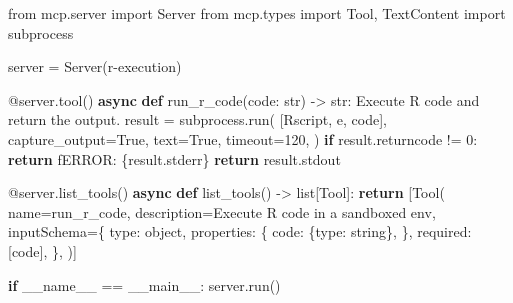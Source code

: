 \documentclass[
  letterpaper,
  11pt]{scrbook}
\newenvironment{Shaded}{\begin{snugshade}}{\end{snugshade}}
\newcommand{\AttributeTok}[1]{\textcolor[rgb]{0.40,0.45,0.13}{#1}}
\newcommand{\BuiltInTok}[1]{\textcolor[rgb]{0.00,0.23,0.31}{#1}}
\newcommand{\CommentTok}[1]{\textcolor[rgb]{0.37,0.37,0.37}{#1}}
\newcommand{\ControlFlowTok}[1]{\textcolor[rgb]{0.00,0.23,0.31}{\textbf{#1}}}
\newcommand{\DecValTok}[1]{\textcolor[rgb]{0.68,0.00,0.00}{#1}}
\newcommand{\ImportTok}[1]{\textcolor[rgb]{0.00,0.46,0.62}{#1}}
\newcommand{\KeywordTok}[1]{\textcolor[rgb]{0.00,0.23,0.31}{\textbf{#1}}}
\newcommand{\NormalTok}[1]{\textcolor[rgb]{0.00,0.23,0.31}{#1}}
\newcommand{\OperatorTok}[1]{\textcolor[rgb]{0.37,0.37,0.37}{#1}}
\newcommand{\SpecialCharTok}[1]{\textcolor[rgb]{0.37,0.37,0.37}{#1}}
\newcommand{\SpecialStringTok}[1]{\textcolor[rgb]{0.13,0.47,0.30}{#1}}
\newcommand{\StringTok}[1]{\textcolor[rgb]{0.13,0.47,0.30}{#1}}
\newcommand{\VariableTok}[1]{\textcolor[rgb]{0.07,0.07,0.07}{#1}}
\begin{document}
\begin{Shaded}
\begin{Highlighting}[]
\ImportTok{from}\NormalTok{ mcp.server }\ImportTok{import}\NormalTok{ Server}
\ImportTok{from}\NormalTok{ mcp.types }\ImportTok{import}\NormalTok{ Tool, TextContent}
\ImportTok{import}\NormalTok{ subprocess}

\NormalTok{server }\OperatorTok{=}\NormalTok{ Server(}\StringTok{\textquotesingle{}r{-}execution\textquotesingle{}}\NormalTok{)}

\AttributeTok{@server.tool}\NormalTok{()}
\ControlFlowTok{async} \KeywordTok{def}\NormalTok{ run\_r\_code(code: }\BuiltInTok{str}\NormalTok{) }\OperatorTok{{-}\textgreater{}} \BuiltInTok{str}\NormalTok{:}
    \CommentTok{\textquotesingle{}\textquotesingle{}\textquotesingle{}Execute R code and return the output.\textquotesingle{}\textquotesingle{}\textquotesingle{}}
\NormalTok{    result }\OperatorTok{=}\NormalTok{ subprocess.run(}
\NormalTok{        [}\StringTok{\textquotesingle{}Rscript\textquotesingle{}}\NormalTok{, }\StringTok{\textquotesingle{}{-}e\textquotesingle{}}\NormalTok{, code],}
\NormalTok{        capture\_output}\OperatorTok{=}\VariableTok{True}\NormalTok{,}
\NormalTok{        text}\OperatorTok{=}\VariableTok{True}\NormalTok{,}
\NormalTok{        timeout}\OperatorTok{=}\DecValTok{120}\NormalTok{,}
\NormalTok{    )}
    \ControlFlowTok{if}\NormalTok{ result.returncode }\OperatorTok{!=} \DecValTok{0}\NormalTok{:}
        \ControlFlowTok{return} \SpecialStringTok{f\textquotesingle{}ERROR: }\SpecialCharTok{\{}\NormalTok{result}\SpecialCharTok{.}\NormalTok{stderr}\SpecialCharTok{\}}\SpecialStringTok{\textquotesingle{}}
    \ControlFlowTok{return}\NormalTok{ result.stdout}

\AttributeTok{@server.list\_tools}\NormalTok{()}
\ControlFlowTok{async} \KeywordTok{def}\NormalTok{ list\_tools() }\OperatorTok{{-}\textgreater{}} \BuiltInTok{list}\NormalTok{[Tool]:}
    \ControlFlowTok{return}\NormalTok{ [Tool(}
\NormalTok{        name}\OperatorTok{=}\StringTok{\textquotesingle{}run\_r\_code\textquotesingle{}}\NormalTok{,}
\NormalTok{        description}\OperatorTok{=}\StringTok{\textquotesingle{}Execute R code in a sandboxed env\textquotesingle{}}\NormalTok{,}
\NormalTok{        inputSchema}\OperatorTok{=}\NormalTok{\{}
            \StringTok{\textquotesingle{}type\textquotesingle{}}\NormalTok{: }\StringTok{\textquotesingle{}object\textquotesingle{}}\NormalTok{,}
            \StringTok{\textquotesingle{}properties\textquotesingle{}}\NormalTok{: \{}
                \StringTok{\textquotesingle{}code\textquotesingle{}}\NormalTok{: \{}\StringTok{\textquotesingle{}type\textquotesingle{}}\NormalTok{: }\StringTok{\textquotesingle{}string\textquotesingle{}}\NormalTok{\},}
\NormalTok{            \},}
            \StringTok{\textquotesingle{}required\textquotesingle{}}\NormalTok{: [}\StringTok{\textquotesingle{}code\textquotesingle{}}\NormalTok{],}
\NormalTok{        \},}
\NormalTok{    )]}

\ControlFlowTok{if} \VariableTok{\_\_name\_\_} \OperatorTok{==} \StringTok{\textquotesingle{}\_\_main\_\_\textquotesingle{}}\NormalTok{:}
\NormalTok{    server.run()}
\end{Highlighting}
\end{Shaded}
\end{document}
